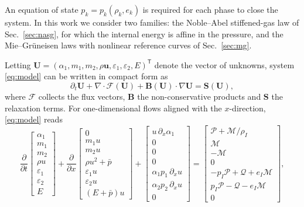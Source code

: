An equation of state $p_k=p_k(\rho_k,e_k)$ is required for each phase to close the system. In this work we consider two
families: the Noble--Abel stiffened-gas law of Sec.~\ref{sec:nasg}, for which the internal energy is affine in the
pressure, and the Mie--Gr\"uneisen laws with nonlinear reference curves of Sec.~\ref{sec:mg}.

Letting $\mathbf U=(\alpha_1,m_1,m_2,\rho\mathbf u,\varepsilon_1,\varepsilon_2,E)^{\mathsf T}$ denote the vector of unknowns, system \eqref{eq:model} can be
written in compact form as
\begin{equation}
\partial_t\mathbf U+\nabla\cdot\boldsymbol{\mathcal F}(\mathbf U)+\mathbf B(\mathbf U)\cdot\nabla\mathbf U=\mathbf S(\mathbf U),
\label{eq:compact}
\end{equation}
where $\boldsymbol{\mathcal F}$ collects the flux vectors, $\mathbf B$ the non-conservative products and $\mathbf S$ the relaxation terms. For
one-dimensional flows aligned with the $x$-direction, \eqref{eq:model} reads
\begin{equation}
\frac{\partial}{\partial t}\begin{bmatrix}\alpha_1\\ m_1\\ m_2\\ \rho u\\ \varepsilon_1\\ \varepsilon_2\\ E\end{bmatrix}
+\frac{\partial}{\partial x}\begin{bmatrix}0\\ m_1u\\ m_2u\\ \rho u^2+\bar p\\ \varepsilon_1u\\ \varepsilon_2u\\ (E+\bar p)u\end{bmatrix}
+\begin{bmatrix}u\,\partial_x\alpha_1\\0\\0\\0\\ \alpha_1p_1\,\partial_xu\\ \alpha_2p_2\,\partial_xu\\0\end{bmatrix}
=\begin{bmatrix}\mathcal P+\mathcal M/\rho_I\\ \mathcal M\\ -\mathcal M\\ 0\\ -p_I\mathcal P+\mathcal Q+e_I\mathcal M\\ p_I\mathcal P-\mathcal Q-e_I\mathcal M\\ 0\end{bmatrix},
\label{eq:general}
\end{equation}
